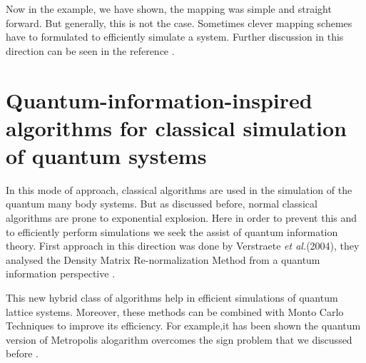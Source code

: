 \documentclass[12pt,a4paper]{report}
\begin{document}
Now in the example, we have shown, the mapping was simple and straight forward. But generally, this is not the case. Sometimes clever mapping schemes have to formulated to efficiently simulate a system. Further discussion in this direction can be seen in the reference \cite{georgescu}.

\section{ Quantum-information-inspired algorithms for classical simulation of quantum systems }
In this mode of approach, classical algorithms are used in the simulation of the quantum many body systems. But as discussed before, normal classical algorithms are prone to exponential explosion. Here in order to prevent this and to efficiently perform simulations we seek the assist of quantum information theory. First approach in this direction was done by Verstraete \emph{et al.}(2004), they analysed the Density Matrix Re-normalization Method from a quantum information perspective \cite{cirac}.\par This new hybrid class of algorithms help in efficient simulations of quantum lattice systems. Moreover, these methods can be combined with Monto Carlo Techniques to improve its efficiency. For example,it has been shown the quantum version of Metropolis alogarithm overcomes the sign problem that we discussed before \cite{temme2011}.


\printindex
\end{document}
